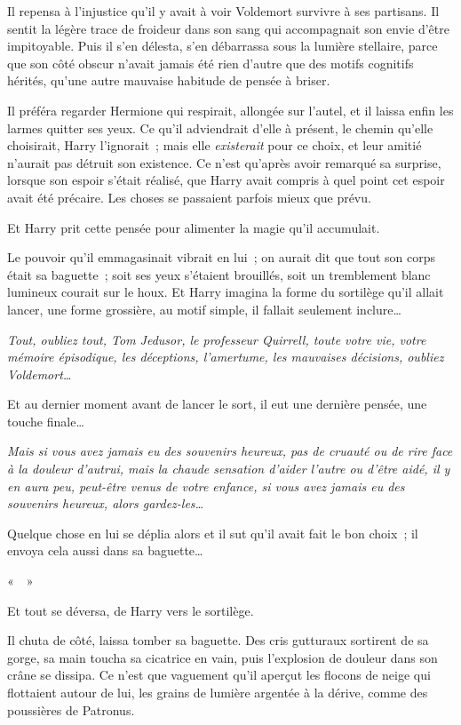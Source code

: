 Il repensa à l'injustice qu'il y avait à voir Voldemort survivre à ses partisans. Il sentit la légère trace de froideur dans son sang qui accompagnait son envie d'être impitoyable. Puis il s'en délesta, s'en débarrassa sous la lumière stellaire, parce que son côté obscur n'avait jamais été rien d'autre que des motifs cognitifs hérités, qu'une autre mauvaise habitude de pensée à briser.

Il préféra regarder Hermione qui respirait, allongée sur l'autel, et il laissa enfin les larmes quitter ses yeux. Ce qu'il adviendrait d'elle à présent, le chemin qu'elle choisirait, Harry l'ignorait~; mais elle \emph{existerait} pour ce choix, et leur amitié n'aurait pas détruit son existence. Ce n'est qu'après avoir remarqué sa surprise, lorsque son espoir s'était réalisé, que Harry avait compris à quel point cet espoir avait été précaire. Les choses se passaient parfois mieux que prévu.

Et Harry prit cette pensée pour alimenter la magie qu'il accumulait.

Le pouvoir qu'il emmagasinait vibrait en lui~; on aurait dit que tout son corps était sa baguette~; soit ses yeux s'étaient brouillés, soit un tremblement blanc lumineux courait sur le houx. Et Harry imagina la forme du sortilège qu'il allait lancer, une forme grossière, au motif simple, il fallait seulement inclure…

\emph{Tout, oubliez tout, Tom Jedusor, le professeur Quirrell, toute votre vie, votre mémoire épisodique, les déceptions, l'amertume, les mauvaises décisions, oubliez Voldemort…}

Et au dernier moment avant de lancer le sort, il eut une dernière pensée, une touche finale…

\emph{Mais si vous avez jamais eu des souvenirs heureux, pas de cruauté ou de rire face à la douleur d'autrui, mais la chaude sensation d'aider l'autre ou d'être aidé, il y en aura peu, peut-être venus de votre enfance, si vous avez jamais eu des souvenirs heureux, alors gardez-les…}

Quelque chose en lui se déplia alors et il sut qu'il avait fait le bon choix~; il envoya cela aussi dans sa baguette…

«~\emph{}~»

Et tout se déversa, de Harry vers le sortilège.

Il chuta de côté, laissa tomber sa baguette. Des cris gutturaux sortirent de sa gorge, sa main toucha sa cicatrice en vain, puis l'explosion de douleur dans son crâne se dissipa. Ce n'est que vaguement qu'il aperçut les flocons de neige qui flottaient autour de lui, les grains de lumière argentée à la dérive, comme des poussières de Patronus.

